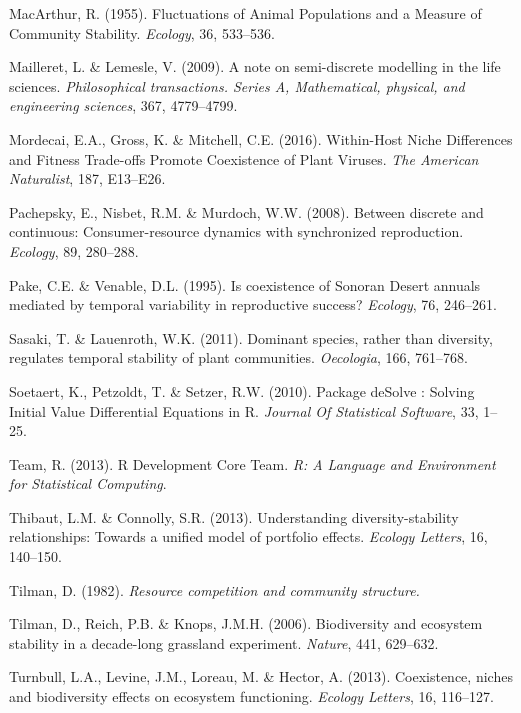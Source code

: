 \documentclass[12pt,]{article}
\begin{document}
\hypertarget{ref-MacArthur1955}{}
MacArthur, R. (1955). Fluctuations of Animal Populations and a Measure
of Community Stability. \emph{Ecology}, 36, 533--536.

\hypertarget{ref-Mailleret2009}{}
Mailleret, L. \& Lemesle, V. (2009). A note on semi-discrete modelling
in the life sciences. \emph{Philosophical transactions. Series A,
Mathematical, physical, and engineering sciences}, 367, 4779--4799.

\hypertarget{ref-Mordecai2016}{}
Mordecai, E.A., Gross, K. \& Mitchell, C.E. (2016). Within-Host Niche
Differences and Fitness Trade-offs Promote Coexistence of Plant Viruses.
\emph{The American Naturalist}, 187, E13--E26.

\hypertarget{ref-Pachepsky2008}{}
Pachepsky, E., Nisbet, R.M. \& Murdoch, W.W. (2008). Between discrete
and continuous: Consumer-resource dynamics with synchronized
reproduction. \emph{Ecology}, 89, 280--288.

\hypertarget{ref-Pake1995}{}
Pake, C.E. \& Venable, D.L. (1995). Is coexistence of Sonoran Desert
annuals mediated by temporal variability in reproductive success?
\emph{Ecology}, 76, 246--261.

\hypertarget{ref-Sasaki2011}{}
Sasaki, T. \& Lauenroth, W.K. (2011). Dominant species, rather than
diversity, regulates temporal stability of plant communities.
\emph{Oecologia}, 166, 761--768.

\hypertarget{ref-Soetaert2010}{}
Soetaert, K., Petzoldt, T. \& Setzer, R.W. (2010). Package deSolve :
Solving Initial Value Differential Equations in R. \emph{Journal Of
Statistical Software}, 33, 1--25.

\hypertarget{ref-Team2013}{}
Team, R. (2013). R Development Core Team. \emph{R: A Language and
Environment for Statistical Computing}.

\hypertarget{ref-Thibaut2013}{}
Thibaut, L.M. \& Connolly, S.R. (2013). Understanding
diversity-stability relationships: Towards a unified model of portfolio
effects. \emph{Ecology Letters}, 16, 140--150.

\hypertarget{ref-Tilman1982}{}
Tilman, D. (1982). \emph{Resource competition and community structure.}

\hypertarget{ref-Tilman2006}{}
Tilman, D., Reich, P.B. \& Knops, J.M.H. (2006). Biodiversity and
ecosystem stability in a decade-long grassland experiment.
\emph{Nature}, 441, 629--632.

\hypertarget{ref-Turnbull2013}{}
Turnbull, L.A., Levine, J.M., Loreau, M. \& Hector, A. (2013).
Coexistence, niches and biodiversity effects on ecosystem functioning.
\emph{Ecology Letters}, 16, 116--127.
\end{document}
